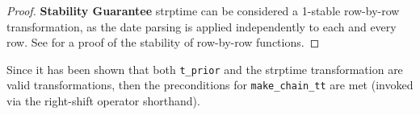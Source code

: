 \documentclass{article}
\begin{document}
\begin{proof}
    \textbf{Stability Guarantee}
    strptime can be considered a 1-stable row-by-row transformation, 
    as the date parsing is applied independently to each and every row.
    See  for a proof of the stability of row-by-row functions.
\end{proof}

Since it has been shown that both \texttt{t\_prior} and the strptime transformation are valid transformations,
then the preconditions for \texttt{make\_chain\_tt} are met (invoked via the right-shift operator shorthand).
\end{document}
